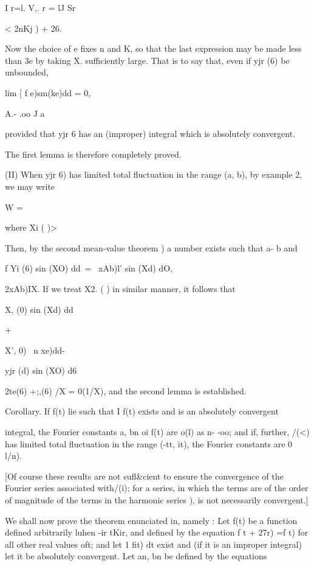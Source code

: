 I r=l. V,. r = lJ Sr

< 2nKj ) + 26.

Now the choice of e fixes n and K, so that the last expression may be
made less than 3e by taking X. sufficiently large. That is to say
that, even if yjr (6) be unbounded,

lim [ f e)sm(ke)dd = 0,

A.- .oo J a

provided that yjr 6 has an (improper) integral which is absolutely
convergent.

The first lemma is therefore completely proved.

(II) When yjr 6) has limited total fluctuation in the range (a, b), by example 2, we may write

 W = %

where Xi ( )> %

Then, by the second mean-value theorem ) a number exists such
that a- b and

f Yi (6) sin (XO) dd\ = \ xAb)l' sin (Xd) dO,

 2xAb)IX. If we treat X2. ( ) in similar manner, it follows that

X, (0) sin (Xd) dd

+

X', 0) \ n xe)dd-

yjr (d) sin (XO) d6

 2te(6) +;,(6) /X = 0(1/X), and the second lemma is established.

Corollary. If f(t) lie such that I f(t) exists and is an absolutely
convergent

integral, the Fourier constants a, bn oi f(t) are o(l) as n- -oo;
and if, further, /(<) has limited total fluctuation in the range (-tt,
it), the Fourier constants are 0 l/n).

[Of course these results are not sufl\&cient to ensure the convergence
of the Fourier series associated with/(i); for a series, in which the
terms are of the order of magnitude of the terms in the harmonic
series ), is not necessarily convergent.]

%
%


We shall now prove the theorem enunciated in, namely : Let f(t)
be a function defined arbitrarily luhen -ir tKir, and defined by the
equation f t + 27r) =f t) for all other real values oft; and let 1
fit) dt exist and (if it is an improper integral) let it be absolutely
convergent. Let an, bn be defined by the equations

